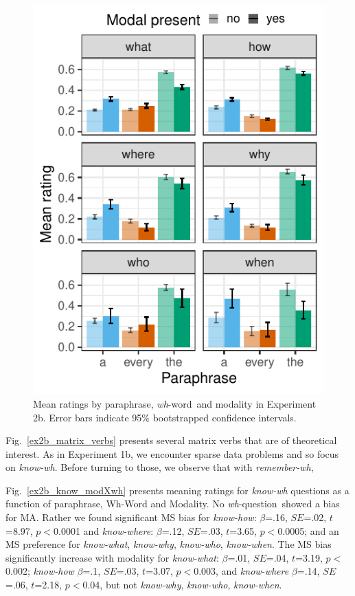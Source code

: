 \documentclass[12pt,letterpaper,table,svgnames,dvipsnames]{article}
\newcommand{\figref}[1]{Fig.~\ref{#1}}
\newcommand{\whq}{\emph{wh}-question~}
\newcommand{\whw}{\emph{wh}-word~}
\begin{document}
\begin{figure}[h!]
\centering
\includegraphics[scale=1]{figures/modxwh_nocontext_embedded.pdf}
\caption{Mean ratings by paraphrase, \whw and modality in Experiment 2b. Error bars indicate 95\% bootstrapped confidence intervals.} 
\label{ex2b_modXwh}
\end{figure}


\figref{ex2b_matrix_verbs} presents several matrix verbs that are of theoretical interest. As in Experiment 1b, we encounter sparse data problems and so focus on \emph{know-wh}. Before turning to those, we observe that with \emph{remember-wh}, 

\figref{ex2b_know_modXwh} presents meaning ratings for \emph{know-wh} questions as a function of paraphrase, Wh-Word and Modality. No \whq showed a bias for MA. Rather we found significant MS bias for \emph{know-how}: $\beta$=.16, $SE$=.02, $t$=8.97, $p<$0.0001 and \emph{know-where}: $\beta$=.12, $SE$=.03, $t$=3.65, $p<$0.0005; and an MS preference for \emph{know-what}, \emph{know-why}, \emph{know-who}, \emph{know-when}. The MS bias significantly increase with modality for \emph{know-what}: $\beta$=.01, $SE$=.04, $t$=3.19, $p<$0.002; \emph{know-how} $\beta$=.1, $SE$=.03, $t$=3.07, $p<$0.003, and \emph{know-where} $\beta$=.14, $SE$=.06, $t$=2.18, $p<$0.04, but not \emph{know-why}, \emph{know-who}, \emph{know-when}.
\end{document}
